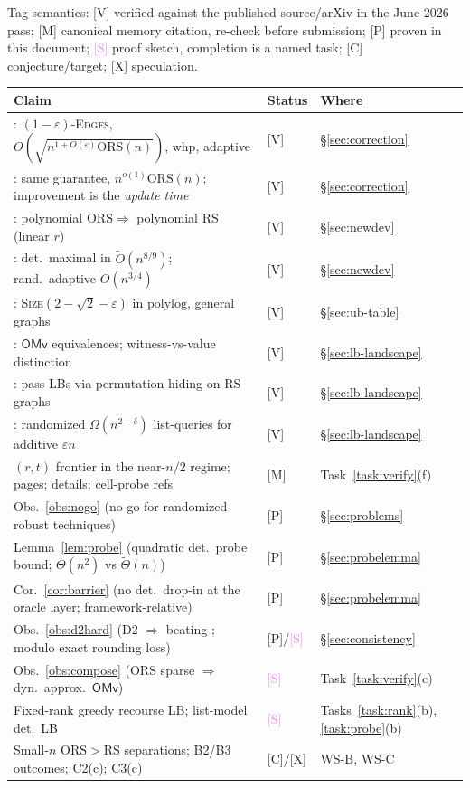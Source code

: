 \documentclass[11pt]{article}
\theoremstyle{definition}
\theoremstyle{remark}
\newcommand{\statusV}{\textcolor{green!45!black}{\textsf{[V]}}}
\newcommand{\statusM}{\textcolor{orange!80!black}{\textsf{[M]}}}
\newcommand{\statusP}{\textcolor{blue!60!black}{\textsf{[P]}}}
\newcommand{\statusS}{\textcolor{violet}{\textsf{[S]}}}
\newcommand{\statusC}{\textcolor{red!70!black}{\textsf{[C]}}}
\newcommand{\statusX}{\textcolor{red!70!black}{\textsf{[X]}}}
\newcommand{\ORS}{\mathrm{ORS}}
\newcommand{\RS}{\mathrm{RS}}
\newcommand{\polylog}{\mathrm{polylog}}
\newcommand{\OMv}{\mathsf{OMv}}
\newcommand{\eps}{\varepsilon}
\newcommand{\Otil}{\widetilde{O}}
\begin{document}
Tag semantics: \statusV{} verified against the published source/arXiv in
the June 2026 pass; \statusM{} canonical memory citation, re-check
before submission; \statusP{} proven in this document; \statusS{} proof
sketch, completion is a named task; \statusC{} conjecture/target;
\statusX{} speculation.

\begin{center}
\small
\begin{tabular}{@{}p{}l l@{}}
\toprule
Claim & Status & Where\\
\midrule
\cite{BG24}: $(1-\eps)$-\textsc{Edges}, $O(\sqrt{n^{1+O(\eps)}\ORS(n)})$,
whp, adaptive & \statusV & \S\ref{sec:correction}\\
\cite{AKK25}: same guarantee, $n^{o(1)}\ORS(n)$; improvement is the
\emph{update time} & \statusV & \S\ref{sec:correction}\\
\cite{Pra26}: polynomial $\ORS \Rightarrow$ polynomial $\RS$ (linear
$r$) & \statusV & \S\ref{sec:newdev}\\
\cite{BBKS25}: det.\ maximal in $\Otil(n^{8/9})$; rand.\ adaptive
$\Otil(n^{3/4})$ & \statusV & \S\ref{sec:newdev}\\
\cite{ABR24}: \textsc{Size}$(2-\sqrt2-\eps)$ in $\polylog$, general
graphs & \statusV & \S\ref{sec:ub-table}\\
\cite{Liu24}: $\OMv$ equivalences; witness-vs-value distinction &
\statusV & \S\ref{sec:lb-landscape}\\
\cite{AS23}: pass LBs via permutation hiding on RS graphs & \statusV &
\S\ref{sec:lb-landscape}\\
\cite{BRR24}: randomized $\Omega(n^{2-\delta})$ list-queries for
additive $\eps n$ & \statusV & \S\ref{sec:lb-landscape}\\
$(r,t)$ frontier in the near-$n/2$ regime; \cite{ABKL23} pages;
\cite{AKLY16,BGS11,BK21,GSSU22} details; cell-probe refs & \statusM &
Task~\ref{task:verify}(f)\\
Obs.~\ref{obs:nogo} (no-go for randomized-robust techniques) &
\statusP & \S\ref{sec:problems}\\
Lemma~\ref{lem:probe} (quadratic det.\ probe bound; $\Theta(n^2)$ vs
$\widetilde\Theta(n)$) & \statusP & \S\ref{sec:probelemma}\\
Cor.~\ref{cor:barrier} (no det.\ drop-in at the oracle layer;
framework-relative) & \statusP & \S\ref{sec:probelemma}\\
Obs.~\ref{obs:d2hard} (D2 $\Rightarrow$ beating \cite{ABR24}; modulo
exact rounding loss) & \statusP/\statusS & \S\ref{sec:consistency}\\
Obs.~\ref{obs:compose} (ORS sparse $\Rightarrow$ dyn.\ approx.\
$\OMv$) & \statusS & Task~\ref{task:verify}(c)\\
Fixed-rank greedy recourse LB; list-model det.\ LB & \statusS &
Tasks~\ref{task:rank}(b), \ref{task:probe}(b)\\
Small-$n$ $\ORS>\RS$ separations; B2/B3 outcomes; C2(c); C3(c) &
\statusC/\statusX & WS-B, WS-C\\
\bottomrule
\end{tabular}
\end{center}
\end{document}
